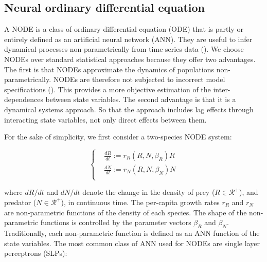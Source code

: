 \documentclass[11pt, oneside]{article}
\begin{document}

\subsection{Neural ordinary differential equation}

A NODE is a class of ordinary differential equation (ODE) that is partly or entirely defined as an artificial neural network (ANN).
They are useful to infer dynamical processes non-parametrically from time series data (\cite{Bonnaffe2021a}).
We choose NODEs over standard statistical approaches because they offer two advantages. 
The first is that NODEs approximate the dynamics of populations non-parametrically.
NODEs are therefore not subjected to incorrect model specifications (\cite{Jost2000,Adamson2013}).
This provides a more objective estimation of the inter-dependences between state variables. 
The second advantage is that it is a dynamical systems approach. 
So that the approach includes lag effects through interacting state variables, not only direct effects between them. 

For the sake of simplicity, we first consider a two-species NODE system: 

\vspace{-0.5cm}
\begin{equation} \left \{ \begin{aligned}
	& \frac{dR}{dt} := r_R(R,N,\beta_R) R \\
	& \frac{dN}{dt} := r_N(R,N,\beta_N) N \\
\end{aligned} \right . \end{equation}

where $dR/dt$ and $dN/dt$ denote the change in the density of prey ($R \in \mathcal{R}^+$), and predator ($N \in \mathcal{R}^+$), in continuous time.
The per-capita growth rates $r_R$ and $r_N$ are non-parametric functions of the density of each species.
The shape of the non-parametric functions is controlled by the parameter vectors $\beta_R$ and $\beta_N$.
Traditionally, each non-parametric function is defined as an ANN function of the state variables.
The most common class of ANN used for NODEs are single layer perceptrons (SLPs): 
\end{document}
